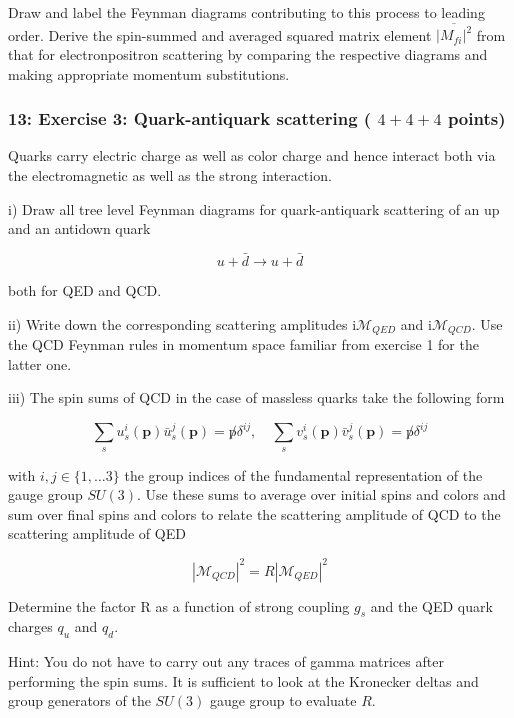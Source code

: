 \documentclass[10pt, letterpaper]{article}
\begin{document}
Draw and label the Feynman diagrams contributing to this process to leading order. Derive the spin-summed and averaged squared matrix element $\overline{\left|M_{f i}\right|^2}$ from that for electronpositron scattering by comparing the respective diagrams and making appropriate momentum substitutions.






\subsubsection{13: Exercise 3: Quark-antiquark scattering ( $4+4+4$ points)}

{\color{blue} Quarks carry electric charge as well as color charge and hence interact both via the electromagnetic as well as the strong interaction.

i) Draw all tree level Feynman diagrams for quark-antiquark scattering of an up and an antidown quark

$$
u+\bar{d} \rightarrow u+\bar{d}
$$

both for QED and QCD.

ii) Write down the corresponding scattering amplitudes $\mathrm{i} \mathcal{M}_{Q E D}$ and $\mathrm{i} \mathcal{M}_{Q C D}$. Use the QCD Feynman rules in momentum space familiar from exercise 1 for the latter one.

iii) The spin sums of QCD in the case of massless quarks take the following form

$$
\sum_s u_s^i(\mathbf{p}) \bar{u}_s^j(\mathbf{p})=\not p \delta^{i j}, \quad \sum_s v_s^i(\mathbf{p}) \bar{v}_s^j(\mathbf{p})=\not p \delta^{i j}
$$

with $i, j \in\{1, \ldots 3\}$ the group indices of the fundamental representation of the gauge group $S U(3)$. Use these sums to average over initial spins and colors and sum over final spins and colors to relate the scattering amplitude of QCD to the scattering amplitude of QED

$$
\left|\mathcal{M}_{Q C D}\right|^2=R\left|\mathcal{M}_{Q E D}\right|^2
$$


Determine the factor R as a function of strong coupling $g_s$ and the QED quark charges $q_u$ and $q_d$.

Hint: You do not have to carry out any traces of gamma matrices after performing the spin sums. It is sufficient to look at the Kronecker deltas and group generators of the $S U(3)$ gauge group to evaluate $R$.}
\end{document}
